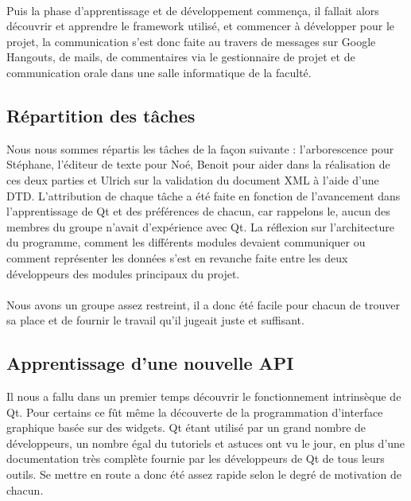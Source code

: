 \paragraph{}

Puis la phase d'apprentissage et de développement commença, il fallait alors découvrir et apprendre le framework utilisé, et commencer à développer pour le projet, la communication s'est donc faite au travers de messages sur Google Hangouts, de mails, de commentaires via le gestionnaire de projet et de communication orale dans une salle informatique de la faculté.
        
\subsection{Répartition des tâches}
Nous nous sommes répartis les tâches de la façon suivante : l'arborescence pour Stéphane, l'éditeur de texte pour Noé, Benoit pour aider dans la réalisation de ces deux parties et Ulrich sur la validation du document XML à l'aide d'une DTD. L'attribution de chaque tâche a été faite en fonction de l'avancement dans l'apprentissage de Qt et des préférences de chacun, car rappelons le, aucun des membres du groupe n'avait d'expérience avec Qt. La réflexion sur l'architecture du programme, comment les différents modules devaient communiquer ou comment représenter les données s'est en revanche faite entre les deux développeurs des modules principaux du projet.
\paragraph{}
Nous avons un groupe assez restreint, il a donc été facile pour chacun de trouver sa place et de fournir le travail qu'il jugeait juste et suffisant.
\paragraph{}


\subsection{Apprentissage d'une nouvelle API}
Il nous a fallu dans un premier temps découvrir le fonctionnement intrinsèque de Qt. Pour certains ce fût même la découverte de la programmation d'interface graphique basée sur des widgets. Qt étant utilisé par un grand nombre de développeurs, un nombre égal du tutoriels et astuces ont vu le jour, en plus d'une documentation très complète fournie par les développeurs de Qt de tous leurs outils. Se mettre en route a donc été assez rapide selon le degré de motivation de chacun.
